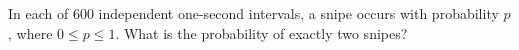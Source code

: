 In each of $600$ independent one-second intervals, a snipe occurs with probability $p$, where $0\le p\le1$. What is the probability of exactly two snipes?

